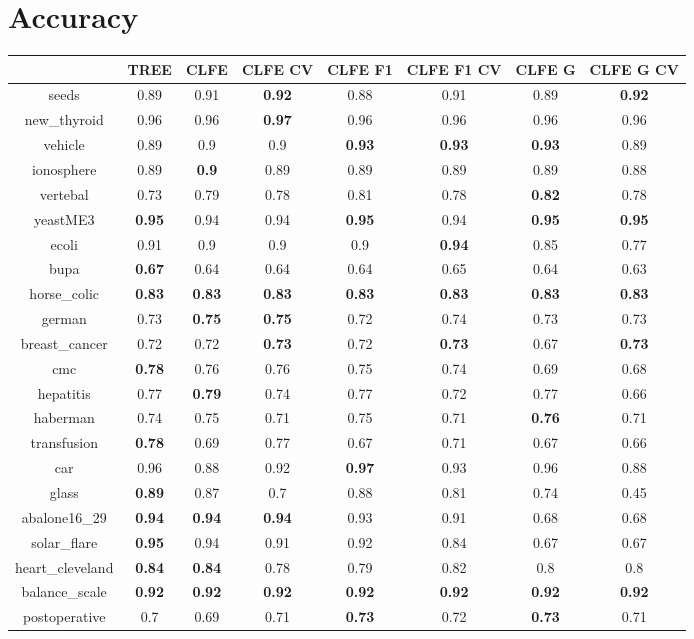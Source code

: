 \documentclass{article}%
\begin{document}
%
\normalsize%
\section*{Accuracy}%
\begin{tabular}{c|ccccccc}%
\hline%
&TREE&CLFE&CLFE CV&CLFE F1&CLFE F1 CV&CLFE G&CLFE G CV\\%
\hline%
seeds&0.89&0.91&\textbf{0.92}&0.88&0.91&0.89&\textbf{0.92}\\%
new\_thyroid&0.96&0.96&\textbf{0.97}&0.96&0.96&0.96&0.96\\%
vehicle&0.89&0.9&0.9&\textbf{0.93}&\textbf{0.93}&\textbf{0.93}&0.89\\%
ionosphere&0.89&\textbf{0.9}&0.89&0.89&0.89&0.89&0.88\\%
vertebal&0.73&0.79&0.78&0.81&0.78&\textbf{0.82}&0.78\\%
yeastME3&\textbf{0.95}&0.94&0.94&\textbf{0.95}&0.94&\textbf{0.95}&\textbf{0.95}\\%
ecoli&0.91&0.9&0.9&0.9&\textbf{0.94}&0.85&0.77\\%
bupa&\textbf{0.67}&0.64&0.64&0.64&0.65&0.64&0.63\\%
horse\_colic&\textbf{0.83}&\textbf{0.83}&\textbf{0.83}&\textbf{0.83}&\textbf{0.83}&\textbf{0.83}&\textbf{0.83}\\%
german&0.73&\textbf{0.75}&\textbf{0.75}&0.72&0.74&0.73&0.73\\%
breast\_cancer&0.72&0.72&\textbf{0.73}&0.72&\textbf{0.73}&0.67&\textbf{0.73}\\%
cmc&\textbf{0.78}&0.76&0.76&0.75&0.74&0.69&0.68\\%
hepatitis&0.77&\textbf{0.79}&0.74&0.77&0.72&0.77&0.66\\%
haberman&0.74&0.75&0.71&0.75&0.71&\textbf{0.76}&0.71\\%
transfusion&\textbf{0.78}&0.69&0.77&0.67&0.71&0.67&0.66\\%
car&0.96&0.88&0.92&\textbf{0.97}&0.93&0.96&0.88\\%
glass&\textbf{0.89}&0.87&0.7&0.88&0.81&0.74&0.45\\%
abalone16\_29&\textbf{0.94}&\textbf{0.94}&\textbf{0.94}&0.93&0.91&0.68&0.68\\%
solar\_flare&\textbf{0.95}&0.94&0.91&0.92&0.84&0.67&0.67\\%
heart\_cleveland&\textbf{0.84}&\textbf{0.84}&0.78&0.79&0.82&0.8&0.8\\%
balance\_scale&\textbf{0.92}&\textbf{0.92}&\textbf{0.92}&\textbf{0.92}&\textbf{0.92}&\textbf{0.92}&\textbf{0.92}\\%
postoperative&0.7&0.69&0.71&\textbf{0.73}&0.72&\textbf{0.73}&0.71\\%
\end{tabular}
\end{document}
